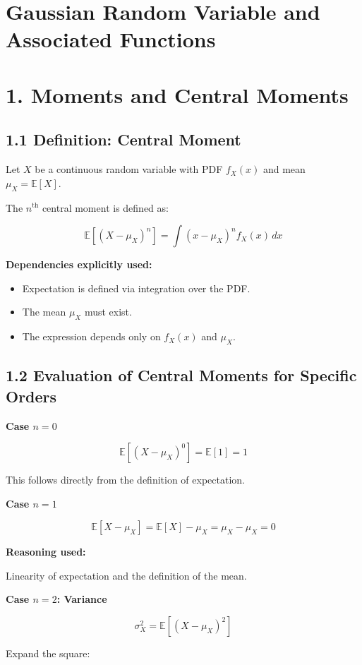 \documentclass[12pt]{article}
\begin{document}
\section*{Gaussian Random Variable and Associated Functions}


\section*{1. Moments and Central Moments}

\subsection*{1.1 Definition: Central Moment}

Let $X$ be a continuous random variable with PDF $f_X(x)$ and mean $\mu_X = \mathbb{E}[X]$.
  
The $n^{\text{th}}$ central moment is defined as:

\[
\mathbb{E}\left[(X - \mu_X)^n\right] = \int (x - \mu_X)^n f_X(x)\, dx
\]

\textbf{Dependencies explicitly used:}
\begin{itemize}
\item Expectation is defined via integration over the PDF.
\item The mean $\mu_X$ must exist.
\item The expression depends only on $f_X(x)$ and $\mu_X$.
\end{itemize}

\subsection*{1.2 Evaluation of Central Moments for Specific Orders}

\textbf{Case $n=0$}

\[
\mathbb{E}[(X - \mu_X)^0] = \mathbb{E}[1] = 1
\]

This follows directly from the definition of expectation.

\textbf{Case $n=1$}

\[
\mathbb{E}[X - \mu_X] = \mathbb{E}[X] - \mu_X = \mu_X - \mu_X = 0
\]

\textbf{Reasoning used:}

Linearity of expectation and the definition of the mean.

\textbf{Case $n=2$: Variance}

\[
\sigma_X^2 = \mathbb{E}\left[(X - \mu_X)^2\right]
\]

Expand the square:
\end{document}

